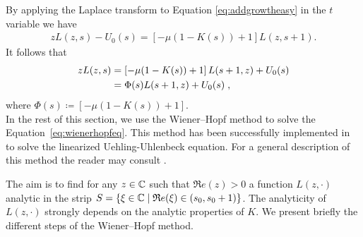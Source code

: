 \documentclass[11pt]{amsart}
\renewcommand{\Re}{\mathfrak{R}e}
\begin{document}
By applying the Laplace transform to Equation \eqref{eq:addgrowtheasy} in the $t$ variable we have 
\begin{align*}
    zL(z,s) - U_0(s) = \left[- \mu (1-K(s)) + 1\right] L(z,s+1).
\end{align*}
It follows that 
\begin{equation}
\begin{aligned}
    \label{eq:wienerhopfeq}
    zL(z,s) 
    &= \left[- \mu (1-K(s)) + 1\right] L(s+1,z) + U_0(s) \\
    &= \Phi(s) L(s+1,z) + U_0(s)
    \; ,
\end{aligned} 
\end{equation}
where $\Phi(s) \coloneqq \left[- \mu (1-K(s)) + 1\right]$. \\

In the rest of this section, we use the Wiener--Hopf method to solve the Equation~\eqref{eq:wienerhopfeq}. This method has been successfully implemented in \cite{escobedo2007fundamental} to solve the linearized Uehling-Uhlenbeck equation. For a general description of this method the reader may consult \cite{zakharov2012kolmogorov}. 
\medskip

The aim is to find for any $z \in \mathbb{C}$ such that $\Re(z) > 0$ a function $L(z, \cdot)$ analytic in the strip $S = \{\xi \in \CC \mid \Re(\xi) \in (s_0, s_0+1)\}$. The analyticity of $L(z, \cdot)$ strongly depends on the analytic properties of $K$. We present briefly the different steps of the Wiener--Hopf method. 
\end{document}
